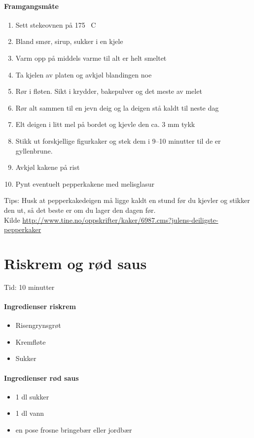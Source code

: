 \documentclass[12pt,a4paper]{book}
\begin{document}
\paragraph{Framgangsmåte}
\begin{enumerate}[noitemsep]
	\item Sett stekeovnen på 175 \degree~C
	\item Bland smør, sirup, sukker i en kjele
	\item Varm opp på middels varme til alt er helt smeltet
	\item Ta kjelen av platen og avkjøl blandingen noe
	\item Rør i fløten. Sikt i krydder, bakepulver og det meste av melet
	\item Rør alt sammen til en jevn deig og la deigen stå kaldt til neste dag
	\item Elt deigen i litt mel på bordet og kjevle den ca. 3 mm tykk
	\item Stikk ut forskjellige figurkaker og stek dem i 9--10 minutter til de er gyllenbrune.
	\item Avkjøl kakene på rist
	\item Pynt eventuelt pepperkakene med melisglasur
\end{enumerate}



Tips: Husk at pepperkakedeigen må ligge kaldt en stund før du kjevler og stikker den ut, så det beste er om du lager den dagen før.\\

Kilde \url{http://www.tine.no/oppskrifter/kaker/6987.cms?julens-deiligste-pepperkaker}
\clearpage{}
\clearpage{}\section{﻿Riskrem og rød saus}
\label{riskrem}

Tid: 10 minutter

\paragraph{Ingredienser riskrem}
\begin{itemize}[noitemsep]
	\item Risengrynsgrøt
	\item Kremfløte
	\item Sukker
\end{itemize}

\paragraph{Ingredienser rød saus}
\begin{itemize}[noitemsep]
	\item 1 dl sukker
	\item 1 dl vann
	\item en pose frosne bringebær eller jordbær
\end{itemize}
\end{document}
